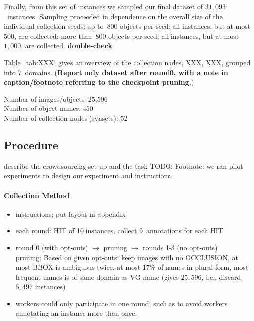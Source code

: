 Finally, from this set of instances we sampled our final dataset of $31,093$~instances. 
Sampling proceeded in dependence on the overall size of the individual collection seeds: 
up to~$800$ objects per seed: all instances, but at most 500, are collected; more than~$800$ objects per seed: all instances, but at most~$1,000$, are collected.  \textbf{double-check}


Table~\ref{tab:XXX} gives an overview of the collection nodes, XXX, XXX, grouped into $7$~domains. (\textbf{Report only dataset after round0, with a note in caption/footnote referring to the checkpoint pruning.})

Number of images/objects:        25,596\\
Number of object names:  450\\
Number of collection nodes (synsets):    52 \\

\subsection{Procedure} describe the crowdsourcing set-up and the task
TODO: Footnote: we ran pilot experiments to design our experiment and instructions.
\paragraph{Collection Method}
\begin{itemize}
	\item instructions; put layout in appendix
	\item each round: HIT of 10 instances, collect 9~annotations for each HIT
	\item round 0 (with opt-outs) $\rightarrow$ pruning $\rightarrow$ rounds 1-3 (no opt-outs)\\
	pruning: Based on given opt-outs: keep images with no OCCLUSION, at most BBOX is ambiguous twice, at most 17\% of names in plural form, most frequent names is of same domain as VG name (gives $25,596$, i.e., discard $5,497$ instances)
	\item workers could only participate in one round, such as to avoid workers annotating an instance more than once. 
\end{itemize}

